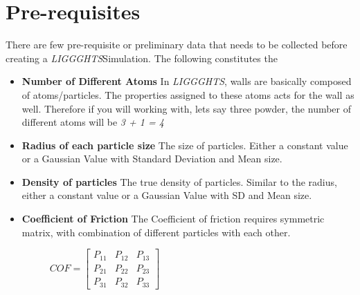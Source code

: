 \documentclass{tufte-book} %
\newcommand{\Li}{\textit{LIGGGHTS}}
\begin{document}
\section{Pre-requisites}

There are few pre-requisite or preliminary data that needs to be collected before creating a \Li Simulation. The following constitutes the
\begin{itemize}
\item \textbf{Number of Different Atoms}
  In \Li, walls are basically composed of atoms/particles. The properties assigned to these atoms acts for the wall as well. Therefore if you will working with, lets say three powder, the number of different atoms will be \textit{3 + 1 = 4}
\item \textbf{Radius of each particle size} The size of particles. Either a constant value or a Gaussian Value with Standard Deviation and Mean size.
\item\textbf{ Density of particles} The true density of particles. Similar to the radius, either a constant value or a Gaussian Value with SD and Mean size.
\item \textbf{Coefficient of Friction} The Coefficient of friction requires symmetric matrix, with combination of different particles with each other.
  \begin{figure}
    \centering
    $COF =
    \begin{bmatrix}
      P_{11}&P_{12}&P_{13}\\ P_{21}&P_{22}&P_{23} \\
      P_{31}&P_{32}&P_{33}
   
    \end{bmatrix}$
     

\end{figure}
\end{itemize}
\end{document}
